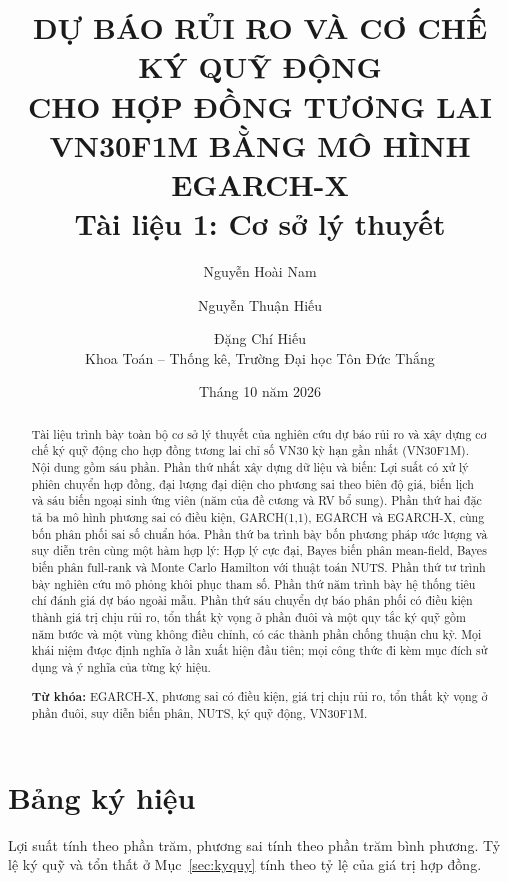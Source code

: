 \documentclass[12pt,a4paper]{article}
\title{\textbf{DỰ BÁO RỦI RO VÀ CƠ CHẾ KÝ QUỸ ĐỘNG\\ CHO HỢP ĐỒNG TƯƠNG LAI VN30F1M BẰNG MÔ HÌNH EGARCH-X}\\[8pt]
\large Tài liệu 1: Cơ sở lý thuyết}
\author{Nguyễn Hoài Nam \and Nguyễn Thuận Hiếu \and Đặng Chí Hiếu\\[4pt]
\small Khoa Toán -- Thống kê, Trường Đại học Tôn Đức Thắng}
\date{Tháng 10 năm 2026}
\theoremstyle{definition}
\theoremstyle{remark}
\begin{document}
\maketitle
\thispagestyle{empty}

\begin{abstract}
\noindent Tài liệu trình bày toàn bộ cơ sở lý thuyết của nghiên cứu dự báo rủi ro và xây dựng cơ chế ký quỹ động cho hợp đồng tương lai chỉ số VN30 kỳ hạn gần nhất (VN30F1M). Nội dung gồm sáu phần. Phần thứ nhất xây dựng dữ liệu và biến: Lợi suất có xử lý phiên chuyển hợp đồng, đại lượng đại diện cho phương sai theo biên độ giá, biến lịch và sáu biến ngoại sinh ứng viên (năm của đề cương và RV bổ sung). Phần thứ hai đặc tả ba mô hình phương sai có điều kiện, GARCH(1,1), EGARCH và EGARCH-X, cùng bốn phân phối sai số chuẩn hóa. Phần thứ ba trình bày bốn phương pháp ước lượng và suy diễn trên cùng một hàm hợp lý: Hợp lý cực đại, Bayes biến phân mean-field, Bayes biến phân full-rank và Monte Carlo Hamilton với thuật toán NUTS. Phần thứ tư trình bày nghiên cứu mô phỏng khôi phục tham số. Phần thứ năm trình bày hệ thống tiêu chí đánh giá dự báo ngoài mẫu. Phần thứ sáu chuyển dự báo phân phối có điều kiện thành giá trị chịu rủi ro, tổn thất kỳ vọng ở phần đuôi và một quy tắc ký quỹ gồm năm bước và một vùng không điều chỉnh, có các thành phần chống thuận chu kỳ. Mọi khái niệm được định nghĩa ở lần xuất hiện đầu tiên; mọi công thức đi kèm mục đích sử dụng và ý nghĩa của từng ký hiệu.

\medskip
\noindent\textbf{Từ khóa:} EGARCH-X, phương sai có điều kiện, giá trị chịu rủi ro, tổn thất kỳ vọng ở phần đuôi, suy diễn biến phân, NUTS, ký quỹ động, VN30F1M.
\end{abstract}

\newpage
\tableofcontents
\newpage

\section*{Bảng ký hiệu}

Lợi suất tính theo phần trăm, phương sai tính theo phần trăm bình phương. Tỷ lệ ký quỹ và tổn thất ở Mục~\ref{sec:kyquy} tính theo tỷ lệ của giá trị hợp đồng.
\end{document}
